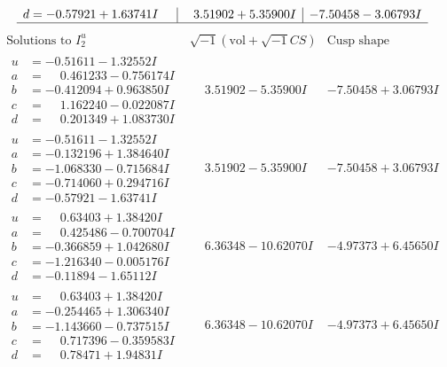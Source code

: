 \documentclass[1p]{elsarticle_modified}
\theoremstyle{definition}
\newcommand{\I}{\sqrt{-1}}
\begin{document}
$$\begin{array}{c|c|c}
\begin{aligned}
d &= -0.57921 + 1.63741 I\end{aligned}
 & \phantom{-}3.51902 + 5.35900 I & -7.50458 - 3.06793 I\\
 \hline 
 \end{array}$$\newpage$$\begin{array}{c|c|c}  
\text{Solutions to }I^u_{2}& \I (\text{vol} + \sqrt{-1}CS) & \text{Cusp shape}\\
 \hline 
\begin{aligned}
u &= -0.51611 - 1.32552 I \\
a &= \phantom{-}0.461233 - 0.756174 I \\
b &= -0.412094 + 0.963850 I \\
c &= \phantom{-}1.162240 - 0.022087 I \\
d &= \phantom{-}0.201349 + 1.083730 I\end{aligned}
 & \phantom{-}3.51902 - 5.35900 I & -7.50458 + 3.06793 I \\ \hline\begin{aligned}
u &= -0.51611 - 1.32552 I \\
a &= -0.132196 + 1.384640 I \\
b &= -1.068330 - 0.715684 I \\
c &= -0.714060 + 0.294716 I \\
d &= -0.57921 - 1.63741 I\end{aligned}
 & \phantom{-}3.51902 - 5.35900 I & -7.50458 + 3.06793 I \\ \hline\begin{aligned}
u &= \phantom{-}0.63403 + 1.38420 I \\
a &= \phantom{-}0.425486 - 0.700704 I \\
b &= -0.366859 + 1.042680 I \\
c &= -1.216340 - 0.005176 I \\
d &= -0.11894 - 1.65112 I\end{aligned}
 & \phantom{-}6.36348 - 10.62070 I & -4.97373 + 6.45650 I \\ \hline\begin{aligned}
u &= \phantom{-}0.63403 + 1.38420 I \\
a &= -0.254465 + 1.306340 I \\
b &= -1.143660 - 0.737515 I \\
c &= \phantom{-}0.717396 - 0.359583 I \\
d &= \phantom{-}0.78471 + 1.94831 I\end{aligned}
 & \phantom{-}6.36348 - 10.62070 I & -4.97373 + 6.45650 I \\ \hline\begin{aligned}

\end{aligned}
\end{array}$$
\end{document}
